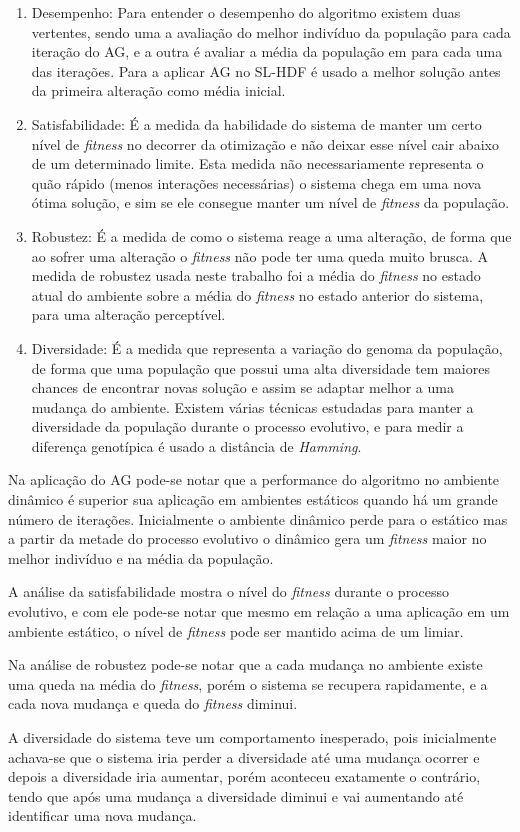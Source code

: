 \begin{enumerate}
	\item Desempenho: Para entender o desempenho do algoritmo existem duas vertentes, sendo uma a avaliação do melhor indivíduo da população para cada iteração do AG, e a outra é avaliar a média da população em para cada uma das iterações. Para a aplicar AG no SL-HDF é usado a melhor solução antes da primeira alteração como média inicial.
	
	\item Satisfabilidade: É a medida da habilidade do sistema de manter um certo nível de \textit{fitness} no decorrer da otimização e não deixar esse nível cair abaixo de um determinado limite. Esta medida não necessariamente representa o quão rápido (menos interações necessárias) o sistema chega em uma nova ótima solução, e sim se ele consegue manter um nível de \textit{fitness} da população.
	
	\item Robustez: É a medida de como o sistema reage a uma alteração, de forma que ao sofrer uma alteração o \textit{fitness} não pode ter uma queda muito brusca. A medida de robustez usada neste trabalho foi a média do \textit{fitness} no estado atual do ambiente sobre a média do \textit{fitness} no estado anterior do sistema, para uma alteração perceptível.
	
	\item Diversidade: É a medida que representa a variação do genoma da população, de forma que uma população que possui uma alta diversidade tem maiores chances de encontrar novas solução e assim se adaptar melhor a uma mudança do ambiente. Existem várias técnicas estudadas para manter a diversidade da população durante o processo evolutivo, e para medir a diferença genotípica é usado a distância de \textit{Hamming}.
\end{enumerate}

Na aplicação do AG pode-se notar que a performance do algoritmo no ambiente dinâmico é superior sua aplicação em ambientes estáticos quando há um grande número de iterações. Inicialmente o ambiente dinâmico perde para o estático mas a partir da metade do processo evolutivo o dinâmico gera um \textit{fitness} maior no melhor indivíduo e na média da população.

A análise da satisfabilidade mostra o nível do \textit{fitness} durante o processo evolutivo, e com ele pode-se notar que mesmo em relação a uma aplicação em um ambiente estático, o nível de \textit{fitness} pode ser mantido acima de um limiar.

Na análise de robustez pode-se notar que a cada mudança no ambiente existe uma queda na média do \textit{fitness}, porém o sistema se recupera rapidamente, e a cada nova mudança e queda do \textit{fitness} diminui.

A diversidade do sistema teve um comportamento inesperado, pois inicialmente achava-se que o sistema iria perder a diversidade até uma mudança ocorrer e depois a diversidade iria aumentar, porém aconteceu exatamente o contrário, tendo que após uma mudança a diversidade diminui e vai aumentando até identificar uma nova mudança.